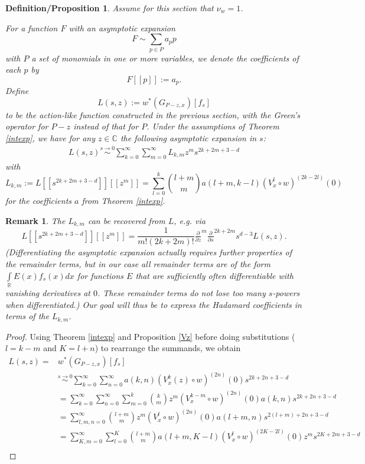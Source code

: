 \documentclass[11pt]{article}
\def\C{{\mathbb{C}}}
\def\R{{\mathbb{R}}}
\def\insum#1{\sum\limits_{#1=0}^\infty}
\def\intR{\int\limits_\R}
\newtheorem{rem}[df]{Remark}
\newtheorem{defprop}[df]{Definition/Proposition}
\begin{document}
\begin{defprop}
	\label{Expwithz}
	Assume for this section that $\nu_w=1$.

	For a function $F$ with an asymptotic expansion \[F\sim \sum\limits_{p\in P}a_p p\] with $P$ a set of monomials in one or more variables, we denote the coefficients of each $p$ by
	\[F[[p]]:=a_p.\]
	Define
	\[L(s,z):=w^*(G_{P-z,x})[f_s]\]
	to be the action-like function constructed in the previous section, with the Green's operator for $P-z$ instead of that for $P$.
	Under the assumptions of Theorem \ref{intexp}, we have for any $z\in \C$ the following asymptotic expansion in $s$:
	\begin{align*}
		L(s,z)\stackrel{s\rightarrow 0}{\sim}\insum{k}\insum{m} L_{k,m} z^m s^{2k+2m+3-d}
	\end{align*}
	with 
	\[L_{k,m}:=L[[ s^{2k+2m+3-d}]][[z^m]]=\sum\limits_{l=0}^k\binom{l+m}{m} a(l+m,k-l)\left(V^{l}_x\circ w\right)^{(2k-2l)}(0)\]
	for the coefficients $a$ from Theorem \ref{intexp}.
\end{defprop}
\begin{rem}
	The $L_{k,m}$ can be recovered from $L$, e.g. via
	\[L[[ s^{2k+2m+3-d}]][[z^m]]=\frac{1}{m!(2k+2m)!}\tfrac{\partial}{\partial z}^m\tfrac{\partial}{\partial s}^{2k+2m}s^{d-3} L(s,z).\] 
	(Differentiating the asymptotic expansion actually requires further properties of the remainder terms, but in our case all remainder terms are of the form $\intR E(x)f_s(x)dx$ for functions $E$ that are sufficiently often differentiable with vanishing derivatives at $0$. These remainder terms do not lose too many $s$-powers when differentiated.)
	Our goal will thus be to express the Hadamard coefficients in terms of the $L_{k,m}$.
\end{rem}
\begin{proof}
	Using Theorem \ref{intexp} and Proposition \ref{Vz} before doing substitutions ($l=k-m$ and $K=l+n$) to rearrange the summands, we obtain
	\begin{align*}
		L(s,z)=&w^*(G_{P-z,x})[f_s]\\
		&\stackrel{s\rightarrow 0}{\sim}\insum{k}\insum{n}a(k,n)\left(V^{k}_x(z)\circ w\right)^{(2n)}(0)s^{2k+2n+3-d}\\
		&=\insum{k}\insum{n}\sum\limits_{m=0}^k\binom{k}{m}z^m \left(V^{k-m}_x\circ w\right)^{(2n)}(0)a(k,n)s^{2k+2n+3-d}\\
		&=\insum{l,m,n}\binom{l+m}{m}z^m \left(V^{l}_x\circ w\right)^{(2n)}(0)a(l+m,n)s^{2(l+m)+2n+3-d}\\
		&=\insum{K,m}\sum\limits_{l=0}^K\binom{l+m}{m} a(l+m,K-l)\left(V^{l}_x\circ w\right)^{(2K-2l)}(0)z^m s^{2K+2m+3-d}\\		
	\end{align*}
\end{proof}
\end{document}
